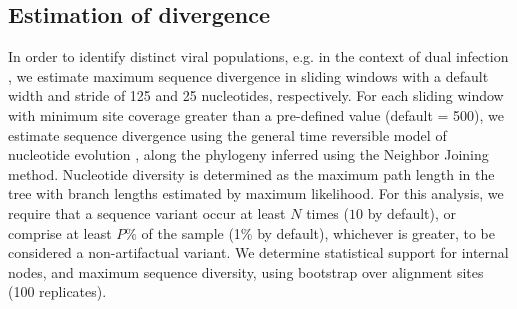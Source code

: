 \documentclass[10pt]{article}
\begin{document}
\subsection*{Estimation of divergence}
In order to identify distinct viral populations,
e.g. in the context of dual infection \cite{Pacold2010},
we estimate maximum sequence divergence in sliding windows with a default width and stride of 125 and 25 nucleotides, respectively.
For each sliding window with minimum site coverage greater than a pre-defined value (default = 500),
we estimate sequence divergence using the general time reversible model of nucleotide evolution \cite{Tavare86},
along the phylogeny inferred using the Neighbor Joining method\cite{Saitou1987}.
Nucleotide diversity is determined as the maximum path length in the tree with branch lengths estimated by maximum likelihood.
For this analysis, we require that a sequence variant occur at least $N$ times ($10$ by default),
or comprise at least $P\%$ of the sample (1\% by default), whichever is greater, to be considered a non-artifactual variant.
We determine statistical support for internal nodes, and maximum sequence diversity, using bootstrap over alignment sites (100 replicates).
\end{document}
